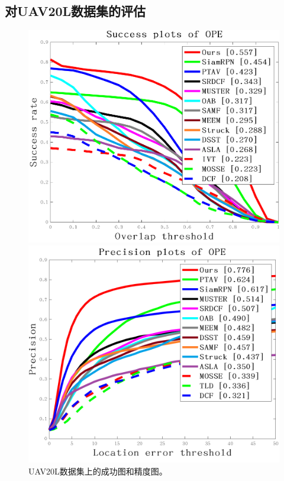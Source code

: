 \subsection{对UAV20L数据集的评估}

\begin{figure}[htb]
\begin{minipage}[b]{0.5\linewidth}
  \centering
  \centerline{\includegraphics[width=1.0\textwidth]{Img/globally/UAV20L/quality_plot_overlap_OPE_AUC.png}}
\end{minipage}
\hfill
\begin{minipage}[b]{0.5\linewidth}
  \centering
  \centerline{\includegraphics[width=1.0\textwidth]{Img/globally/UAV20L/quality_plot_error_OPE_threshold.png}}
\end{minipage}
%
\caption{UAV20L数据集上的成功图和精度图。}
\label{fig:uav20l}
%
\end{figure}

